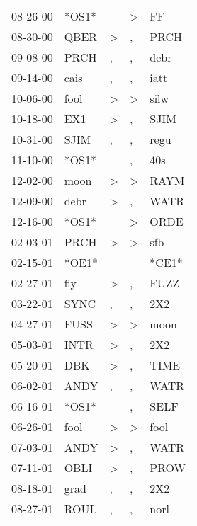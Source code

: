 \begin{supertabular}{lllll}
 08-26-00 &  *OS1* &                  &  \textgreater &     FF \\
 08-30-00 &   QBER &     \textgreater &             , &   PRCH \\
 09-08-00 &   PRCH &                , &             , &   debr \\
 09-14-00 &   cais &                , &             , &   iatt \\
 10-06-00 &   fool &     \textgreater &  \textgreater &   silw \\
 10-18-00 &    EX1 &     \textgreater &             , &   SJIM \\
 10-31-00 &   SJIM &                , &             , &   regu \\
 11-10-00 &  *OS1* &                  &             , &    40s \\
 12-02-00 &   moon &     \textgreater &  \textgreater &   RAYM \\
 12-09-00 &   debr &     \textgreater &             , &   WATR \\
 12-16-00 &  *OS1* &                  &  \textgreater &   ORDE \\
 02-03-01 &   PRCH &     \textgreater &  \textgreater &    sfb \\
 02-15-01 &  *OE1* &                  &               &  *CE1* \\
 02-27-01 &    fly &     \textgreater &             , &   FUZZ \\
 03-22-01 &   SYNC &                , &             , &    2X2 \\
 04-27-01 &   FUSS &     \textgreater &  \textgreater &   moon \\
 05-03-01 &   INTR &     \textgreater &             , &    2X2 \\
 05-20-01 &    DBK &     \textgreater &             , &   TIME \\
 06-02-01 &   ANDY &                , &             , &   WATR \\
 06-16-01 &  *OS1* &                  &             , &   SELF \\
 06-26-01 &   fool &     \textgreater &  \textgreater &   fool \\
 07-03-01 &   ANDY &     \textgreater &             , &   WATR \\
 07-11-01 &   OBLI &     \textgreater &             , &   PROW \\
 08-18-01 &   grad &                , &             , &    2X2 \\
 08-27-01 &   ROUL &                , &             , &   norl \\

\end{supertabular}
